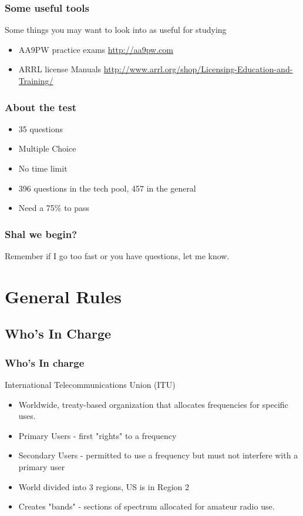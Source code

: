 \documentclass[10pt]{beamer}
\begin{document}
\begin{frame}
\frametitle{Some useful tools}
Some things you may want to look into as useful for studying
\begin{itemize}
\item AA9PW practice exams \url{http://aa9pw.com}
\item ARRL license Manuals \url{http://www.arrl.org/shop/Licensing-Education-and-Training/}
\end{itemize}
\end{frame}

\begin{frame}
\frametitle{About the test}
\begin{itemize}
\item 35 questions \pause
\item Multiple Choice \pause
\item No time limit \pause
\item 396 questions in the tech pool, 457 in the general \pause
\item Need a 75\% to pass
\end{itemize}
\end{frame}

\begin{frame}
\frametitle{Shal we begin?}
Remember if I go too fast or you have questions, let me know.
\end{frame}

\section{General Rules}
\subsection{Who's In Charge}
\begin{frame}
\frametitle{Who's In charge}
International Telecommunications Union (ITU)
\begin{itemize}
\item Worldwide, treaty-based organization that allocates frequencies for specific uses.
\item Primary Users - first "rights" to a frequency
\item Secondary Users - permitted to use a frequency but must not interfere with a primary user
\item World divided into 3 regions, US is in Region 2
\item Creates "bands" - sections of spectrum allocated for amateur radio use.
\end{itemize}
\end{frame}
\end{document}
